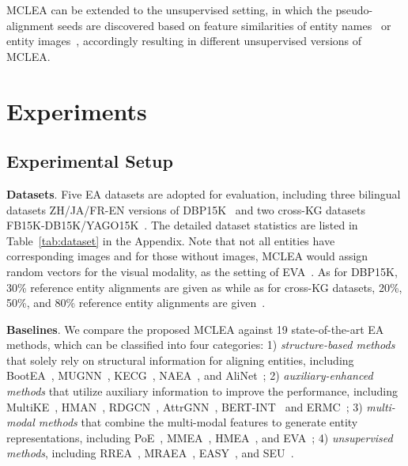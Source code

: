 \documentclass[11pt]{article}
\begin{document}
MCLEA can be extended to the unsupervised setting, in which the pseudo-alignment seeds are discovered based on feature similarities of entity names~\cite{mao2020mraea,ge2021make} or entity images~\cite{liu2021visual}, accordingly resulting in different unsupervised versions of MCLEA.
 
\section{Experiments}



\subsection{Experimental Setup}
\noindent\textbf{Datasets}.
Five EA datasets are adopted for evaluation, including three bilingual datasets ZH/JA/FR-EN versions of DBP15K~\cite{liu2021visual} and two cross-KG datasets FB15K-DB15K/YAGO15K~\cite{liu2019mmkg}.
The detailed dataset statistics are listed in Table~\ref{tab:dataset} in the Appendix.
Note that not all entities have corresponding images and for those without images, MCLEA would assign random vectors for the visual modality, as the setting of EVA~\cite{liu2021visual}.
As for DBP15K, 30\% reference entity alignments are given as  while as for cross-KG datasets, 20\%, 50\%, and 80\% reference entity alignments are given~\cite{liu2019mmkg}.

\noindent\textbf{Baselines}.
We compare the proposed MCLEA against 19 state-of-the-art EA methods, which can be classified into four categories:
1) \textit{structure-based methods} that solely rely on structural information for aligning entities, including BootEA~\cite{sun2018bootstrapping}, MUGNN~\cite{cao2019multi}, KECG~\cite{li2019semi}, NAEA~\cite{zhu2019neighborhood}, and AliNet~\cite{sun2020knowledge};
2) \textit{auxiliary-enhanced methods} that utilize auxiliary information to improve the performance, including MultiKE~\cite{zhang2019multi}, HMAN~\cite{yang2019aligning},
RDGCN~\cite{wu2019relation}, AttrGNN~\cite{liu2020exploring}, BERT-INT~\cite{tang2021bert} and ERMC~\cite{yang2021entity};
3) \textit{multi-modal methods} that combine the multi-modal features to generate entity representations, including PoE~\cite{liu2019mmkg}, MMEA~\cite{chen2020mmea}, HMEA~\cite{guo2021multi}, and EVA~\cite{liu2021visual};
4) \textit{unsupervised methods}, including RREA~\cite{mao2020relational}, MRAEA~\cite{mao2020mraea}, EASY~\cite{ge2021make}, and SEU~\cite{mao2021alignment}.
\end{document}
